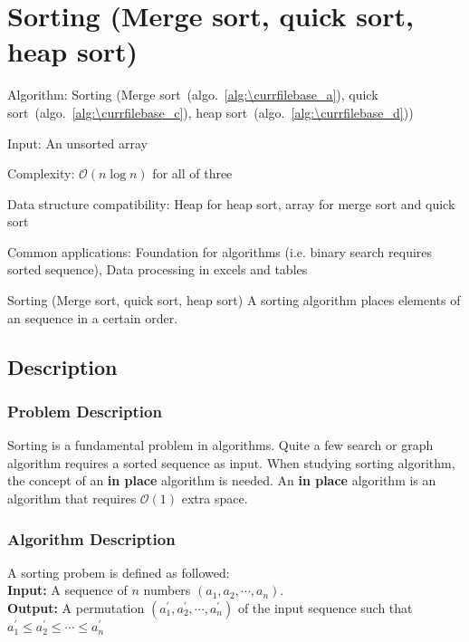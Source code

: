 \documentclass[catalog.tex]{subfiles}
\begin{document}
\def\pbname{Sorting (Merge sort, quick sort, heap sort)} %

\section{\pbname} 

\begin{overview}
\item [Algorithm:] Sorting (Merge sort~(algo.~\ref{alg:\currfilebase_a}), quick sort~(algo.~\ref{alg:\currfilebase_c}), heap sort~(algo.~\ref{alg:\currfilebase_d})) 
\item [Input:] An unsorted array
\item [Complexity:] $\mathcal{O}(n\log n)$ for all of three
\item [Data structure compatibility:] Heap for heap sort, array for merge sort and quick sort
\item [Common applications:] Foundation for algorithms (i.e. binary search requires sorted sequence), Data processing in excels and tables
\end{overview}


\begin{problem}{\pbname}
	A sorting algorithm places elements of an sequence in a certain order.
\end{problem}


\subsection*{Description}
\subsubsection{Problem Description}
Sorting is a fundamental problem in algorithms. Quite a few search or graph algorithm requires a sorted sequence as input. When studying sorting algorithm, the concept of an \textbf{in place} algorithm is needed. An \textbf{in place} algorithm is an algorithm that requires $\mathcal{O}(1)$ extra space.
\subsubsection{Algorithm Description}
A sorting probem is defined as followed:~\cite{intro3rd} \\
\textbf{Input: }A sequence of $n$ numbers $(a_1,a_2,\cdots,a_n)$. \\
\textbf{Output: }A permutation $(a_1^{'},a_2^{'},\cdots,a_n^{'})$ of the input sequence such that $a_1^{'} \leq a_2^{'} \leq \cdots \leq a_n^{'}$\\
\end{document}

